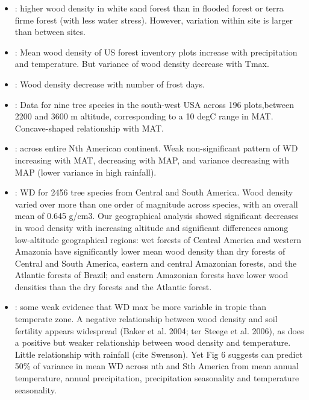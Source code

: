 \documentclass[a4paper,11pt]{article}
\begin{document}
\begin{itemize}
  \item \citet{Fortunel-2014}: higher wood density in white sand forest than in flooded forest or terra firme forest (with less water stress). However, variation within site is larger than between sites.

\item \citet{Swenson-2010}: Mean wood density of US forest inventory plots increase with precipitation and temperature. But variance of wood density decrease with Tmax.

\item \citet{VanBodegom-2014}: Wood density decrease with number of frost days.

\item \citet{Laughlin-2012}: Data for nine tree species in the south-west USA across 196 plots,between 2200 and 3600 m altitude, corresponding to a 10 degC range in MAT. Concave-shaped relationship with MAT.

\item \citet{Simova-2014}: across entire Nth American continent. Weak non-significant pattern of WD increasing with MAT, decreasing with MAP, and variance decreasing with MAP (lower variance in high rainfall).

\item \citet{Chave-2006}: WD for 2456 tree species from Central and South America. Wood density varied over more than one order of magnitude across species, with an overall mean of 0.645 g/cm3. Our geographical analysis showed significant decreases in wood density with increasing altitude and significant differences among low-altitude geographical regions: wet forests of Central America and western Amazonia have significantly lower mean wood density than dry forests of Central and South America, eastern and central Amazonian forests, and the Atlantic forests of Brazil; and eastern Amazonian forests have lower wood densities than the dry forests and the Atlantic forest.

\item \citet{Chave-2009}: some weak evidence that WD max be more variable in tropic than temperate zone. A negative relationship between wood density and soil fertility appears widespread (Baker et al. 2004; ter Steege et al. 2006), as does a positive but weaker relationship between wood density and temperature. Little relationship with rainfall (cite Swenson). Yet Fig 6 suggests can predict 50\% of variance in mean WD across nth and Sth America from mean annual temperature, annual precipitation, precipitation seasonality and temperature seasonality.


\end{itemize}
\end{document}
